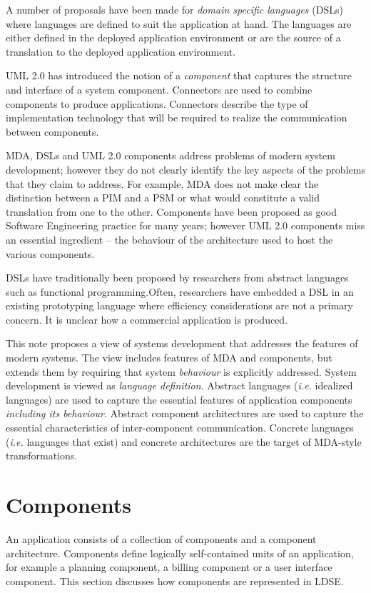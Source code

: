 \documentclass{article}
\begin{document}
A number of proposals have been made for {\em domain specific languages} (DSLs) where
languages are defined to suit the application at hand. The languages are either defined
in the deployed application environment or are the source of a translation to the
deployed application environment.

UML 2.0 has introduced the notion of a {\em component} that captures the structure and
interface of a system component. Connectors are used to combine components to produce
applications. Connectors describe the type of implementation technology that will be
required to realize the communication between components.

MDA, DSLs and UML 2.0 components address problems of modern system development; however they
do not clearly identify the key aspects of the problems that they claim to address. For 
example, MDA does not make clear the distinction between a PIM and a PSM or what would
constitute a valid translation from one to the other. Components have been proposed as
good Software Engineering practice for many years; however UML 2.0 components miss an 
essential ingredient -- the behaviour of the architecture used to host the various components.

DSLs have traditionally been proposed by researchers from abstract languages such as
functional programming.Often, researchers have embedded a DSL in an existing prototyping
language where efficiency considerations are not a primary concern. It is unclear how a 
commercial application is produced. 

This note proposes a view of systems development that addresses the features of modern
systems. The view includes features of MDA and components, but extends them by requiring
that system {\em behaviour} is explicitly addressed. System development is viewed as
{\em language definition}. Abstract languages ({\em i.e.} idealized languages) are used 
to capture the essential features of application components {\em including its behaviour}. 
Abstract component architectures are used to capture the essential characteristics
of inter-component communication. Concrete languages ({\em i.e.} languages that exist) and
concrete architectures are the target of MDA-style transformations. 

\section{Components}

An application consists of a collection of components and a component architecture. 
Components define logically self-contained units of an application, for example
a planning component, a billing component or a user interface component. This section
discusses how components are represented in LDSE. 
\end{document}
